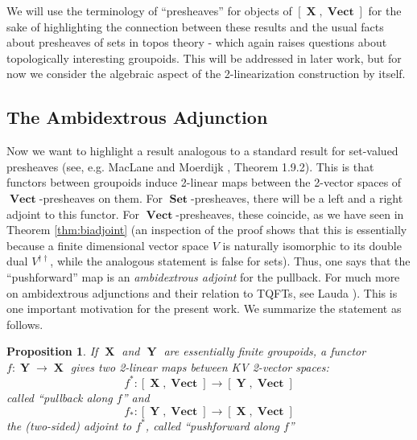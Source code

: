 \documentclass[10pt]{amsart}
\numberwithin{theorem}{subsection}
\newtheorem{proposition}[theorem]{Proposition}
\newcommand{\ra}{\mathop{\rightarrow}}
\newcommand{\opname}[1]{\operatorname{#1}}
\newcommand{\catname}[1]{\boldsymbol{\opname{{#1}}}}
\newcommand{\X}{\catname{X}}
\newcommand{\Y}{\catname{Y}}
\newcommand{\V}{\catname{Vect}}
\newcommand{\Set}{\catname{Set}}
\begin{document}
We will use the terminology of ``presheaves'' for objects of $[\X,\V]$
for the sake of highlighting the connection between these results and
the usual facts about presheaves of sets in topos theory - which again
raises questions about topologically interesting groupoids.  This will
be addressed in later work, but for now we consider the algebraic aspect
of the 2-linearization construction by itself.


\subsection{The Ambidextrous Adjunction}\label{sec:ambadj}

Now we want to highlight a result analogous to a standard result for
set-valued presheaves (see, e.g. MacLane and Moerdijk \cite{macmoer},
Theorem 1.9.2).  This is that functors between groupoids induce
2-linear maps between the 2-vector spaces of $\V$-presheaves on them.
For $\Set$-presheaves, there will be a left and a right adjoint to
this functor.  For $\V$-presheaves, these coincide, as we have seen in Theorem \ref{thm:biadjoint} (an inspection of the proof shows that this is essentially because a finite dimensional vector space $V$ is naturally isomorphic to its double dual $V^{\dagger \dagger}$, while the analogous statement is false for sets).  Thus, one says that the
``pushforward'' map is an \textit{ambidextrous adjoint} for the
pullback.  For much more on ambidextrous
adjunctions and their relation to TQFTs, see Lauda \cite{laudaambidjunction}).  This is one important motivation for the present work.  We summarize the statement as follows.

\begin{proposition}\label{thm:2mapadjoints}If $\X$ and $\Y$ are
essentially finite groupoids, a functor $f:\Y \ra \X$ gives two
2-linear maps between KV 2-vector spaces:
\begin{equation}
f^{\ast} : [ \X, \V ] \ra [\Y,\V]
\end{equation}
called ``pullback along $f$'' and
\begin{equation}
f_{\ast} : [\Y,\V] \ra [\X,\V]
\end{equation}
the (two-sided) adjoint to $f^{\ast}$, called ``pushforward along
$f$''
\end{proposition}
\end{document}
